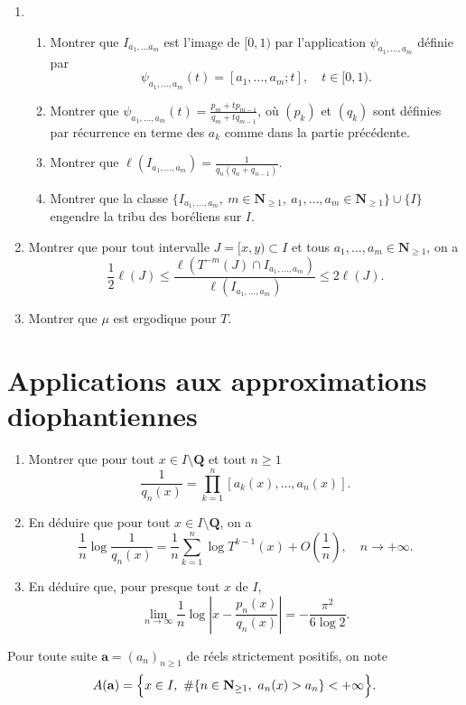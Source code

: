 \documentclass[a4paper,12pt]{article}
\theoremstyle{plain}
\theoremstyle{definition}
\newcommand{\N}{\mathbf{N}}
\newcommand{\Q}{\mathbf{Q}}
\begin{document}
\begin{enumerate}[label=\textbf{\arabic*.},resume]
\item
\begin{enumerate}
\item Montrer que $I_{a_1, \dots a_m}$ est l'image de $[0,1)$ par l'application $\psi_{a_1, \dots, a_m}$ d\'efinie par
$$
\psi_{a_1, \dots, a_m} (t) = [a_1, \dots, a_m ;t], \quad t \in [0,1).
$$
\item Montrer que $\displaystyle{\psi_{a_1, \dots, a_m}(t) = \frac{p_m + tp_{m-1}}{q_m + tq_{m-1}}}$, o\`u $(p_k)$ et $(q_k)$ sont d\'efinies par r\'ecurrence en terme des $a_k$ comme dans la partie pr\'ec\'edente.
\item Montrer que $\displaystyle{\ell(I_{a_1, \dots, a_m}) = \frac{1}{q_n(q_n +q_{n-1})}}$.
\item Montrer que la classe $\{I_{a_1, \dots, a_m}, ~m \in \N_{\geq 1},~a_1, \dots, a_m \in \N_{\geq 1}\} \cup \{I\}$ engendre la tribu des bor\'eliens sur $I$.
\end{enumerate}

\item Montrer que pour tout intervalle $J = [x,y) \subset I$ et tous $a_1, \dots, a_m \in \N_{\geq 1}$, on a 
$$
\frac{1}{2}\ell(J) \leq \frac{\ell(T^{-m}(J) \cap I_{a_1,\dots,a_m})}{\ell(I_{a_1,\dots,a_m})} \leq 2 \ell(J).
$$

\item Montrer que $\mu$ est ergodique pour $T$.
\end{enumerate}

\section*{Applications aux approximations diophantiennes}

\begin{enumerate}[label=\textbf{\arabic*.},resume]

\item Montrer que pour tout $x \in I \setminus \Q$ et tout $n \geq 1$
$$
\frac{1}{q_n(x)} = \prod_{k=1}^n [a_k(x), \dots, a_n(x)].
$$
\item En d\'eduire que pour tout $x \in I \setminus \Q$, on a
$$
\frac{1}{n} \log \frac{1}{q_n(x)} = \frac{1}{n} \sum_{k=1}^n \log T^{k-1}(x) + O\left(\frac{1}{n}\right), \quad n \to + \infty.
$$
\item En d\'eduire que, pour presque tout $x$ de $I$,
$$
\lim_{n \to \infty} \frac{1}{n} \log \left|x - \frac{p_n(x)}{q_n(x)}\right| = - \frac{\pi^2}{6 \log 2}.
$$

\end{enumerate}
Pour toute suite $\mathbf{a} = (a_n)_{n \geq 1}$ de r\'eels strictement positifs, on note 
$$
A(\mathbf{a}) = \Bigl\{ x \in I, ~\# \{n \in \N_{\geq 1},~ a_n(x) > a_n\} < +\infty \Bigr\}.
$$
\end{document}
